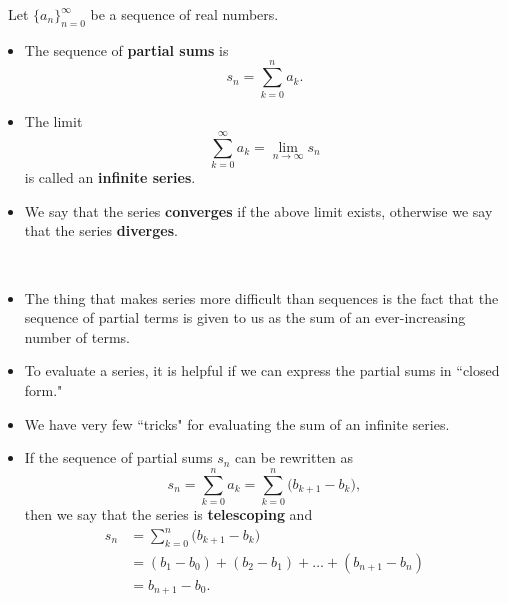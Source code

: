 

\begin{definition}\,
Let $\{a_n\}_{n=0}^\infty$ be a sequence of real numbers.
\begin{itemize}
\item The sequence of \textbf{partial sums} is 
\begin{equation*}
s_n = \sum_{k=0}^na_k.
\end{equation*}
\item The limit 
\begin{equation*}
\sum_{k=0}^\infty a_k = \lim_{n\to\infty}s_n
\end{equation*}
is called an \textbf{infinite series}.
\item We say that the series \textbf{converges} if the above limit exists, otherwise we say that the series \textbf{diverges}.
\end{itemize}
\end{definition}
\begin{remark}\,
\begin{itemize}
\item The thing that makes series more difficult than sequences is the fact that the sequence of partial terms is given to us as the sum of an ever-increasing number of terms.
\item To evaluate a series, it is helpful if we can express the partial sums in ``closed form."
\item We have  very few ``tricks" for evaluating the sum of an infinite series.
\item If the sequence of partial sums $s_n$ can be rewritten as
\begin{equation*}
s_n = \sum_{k=0}^n a_k = \sum_{k=0}^n \big(b_{k+1} - b_k\big),
\end{equation*}
then we say that the series is \textbf{telescoping} and
\begin{equation*}
\begin{split}
s_n &= \sum_{k=0}^n \big(b_{k+1} - b_k\big)\\
& = (b_1 - b_0) + (b_2 - b_1) + \dots + (b_{n+1} - b_n)\\
& = b_{n+1} - b_0.
\end{split}
\end{equation*}
\end{itemize}
\end{remark}

